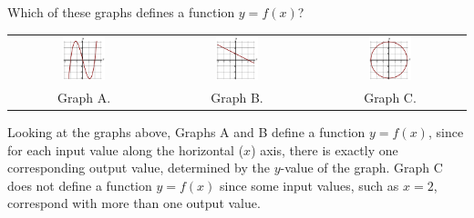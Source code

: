 \begin{example}
\label{ex:1-2-graphs}
Which of these graphs defines a function $y=f(x)$?
\begin{table}[ht!]
\begin{centering}
\begin{tabular}{ccc}
\includegraphics[width=0.3\textwidth]{img/chap1/sec1-2/ex114a.png}
&
\includegraphics[width=0.3\textwidth]{img/chap1/sec1-2/ex114b.png}
&
\includegraphics[width=0.3\textwidth]{img/chap1/sec1-2/ex114c.png}\\
Graph A. & Graph B. & Graph C.\\
\end{tabular}
\end{centering}
\end{table}

\begin{solution} Looking at the graphs above, Graphs A and B define a function $y=f(x)$, since for each input value along the horizontal ($x$) axis, there is exactly one corresponding output value, determined by the $y$-value of the graph. Graph C does not define a function $y=f(x)$ since some input values, such as
$x=2$, correspond with more than one output value.
\end{solution}\end{example}

